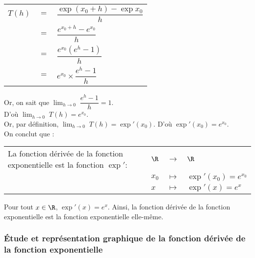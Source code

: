 \begin{tabular}{lll}
$T(h)$ & $=$ & $\dfrac{\exp\left(x_0 + h\right) - \exp x_0}{h}$ \vspace*{.3cm} \\
& $=$ & $\dfrac{e^{x_0 + h} - e^{x_0}}{h}$ \vspace*{.3cm} \\
& $=$ & $\dfrac{e^{x_0}\left(e^h - 1\right)}{h}$ \vspace*{.3cm} \\
& $=$ & $e^{x_0} \times \dfrac{e^h - 1}{h}$ 
\end{tabular}

\vspace*{.3cm}

Or, on sait que $ \displaystyle {\lim_{h \rightarrow 0}} \; \dfrac{e^h - 1}{h} = 1$. \\

D'où $ \displaystyle {\lim_{h \rightarrow 0}} \; T(h) = e^{x_0}$. \\

Or, par définition, $ \displaystyle {\lim_{h \rightarrow 0}} \; T(h) = \exp'\left(x_0\right)$. D'où $\exp'\left(x_0\right) = e^{x_0}$. \\

On conclut que : \\

\begin{tabular}{llll}
\hspace*{-.3cm} La fonction dérivée de la fonction exponentielle est la fonction $\exp':$ & $\R$ & $\longrightarrow$ & $\R$ \\
& $x_0$ & $\longmapsto$ & $\exp'\left(x_0\right) = e^{x_0}$ \\
& $x$ & $\longmapsto$ & $\exp'\left(x\right) = e^{x}$ \\
\end{tabular}

\vspace*{.3cm}

Pour tout $x \in \R$, $\exp'\left(x\right) = e^x$. Ainsi, la fonction dérivée de la fonction exponentielle est la fonction exponentielle elle-même.

\vspace*{-5cm}

\newpage

\subsubsection{Étude et représentation graphique de la fonction dérivée de la fonction exponentielle}

